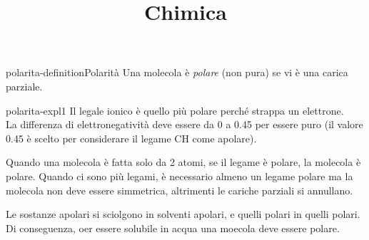 \documentclass[preview]{standalone}
\begin{document}
\title{Chimica}
\genpage

\begin{snippetdefinition}{polarita-definition}{Polarità}
    Una molecola è \textit{polare} (non pura) se vi è una carica parziale.
\end{snippetdefinition}

\begin{snippet}{polarita-expl1}
    Il legale ionico è quello più polare perché strappa un elettrone. \\
    La differenza di elettronegatività deve essere da 0 a 0.45 per essere puro
    (il valore 0.45 è scelto per considerare il legame CH come apolare).

    Quando una molecola è fatta solo da 2 atomi, 
    se il legame è polare, la molecola è polare.
    Quando ci sono più legami, è necessario almeno un legame polare
    ma la molecola non deve essere simmetrica, altrimenti le cariche parziali si annullano.

    Le sostanze apolari si sciolgono in solventi apolari, e quelli polari in quelli polari.
    Di conseguenza, oer essere solubile in acqua una moecola deve essere polare.
\end{snippet}
\end{document}
